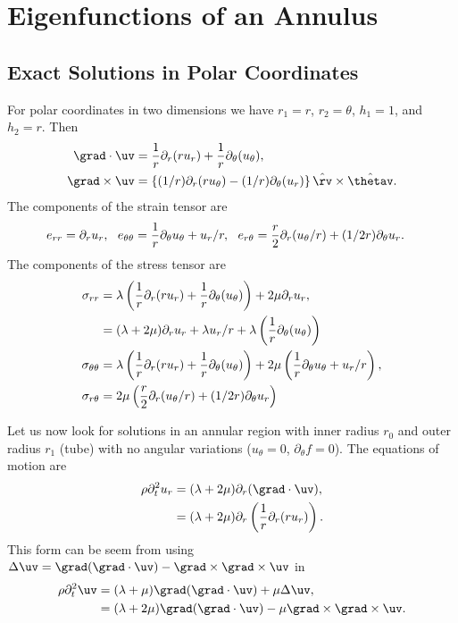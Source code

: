 \newcommand{\annulusEigenDir}{\homeHenshaw/cgDoc/sm}
\section{Eigenfunctions of an Annulus}

\subsection{Exact Solutions in Polar Coordinates}

For polar coordinates in two dimensions we have $r_1=r$, $r_2=\theta$, $h_1=1$, and $h_2=r$. 
Then
\begin{align*}
   \grad\cdot\uv &= {1\over r} \partial_r( r u_r) + {1\over r}\partial_\theta( u_\theta), \\
   \grad\times\uv &= 
             \left\{ (1/r)\partial_r(r u_\theta)-(1/r)\partial_\theta(u_r) \right\} \hat{\rv}\times\hat{\thetav}.
\end{align*}
The components of the strain tensor are
\begin{align*}
    e_{rr} &= \partial_r u_r,~~ e_{\theta\theta}={1\over r}\partial_\theta u_\theta + u_r/r, ~~
    e_{r\theta} = {r\over 2}\partial_r(u_\theta/r) + (1/2r)\partial_\theta u_r . 
\end{align*}
The components of the stress tensor are 
\begin{align}
  \sigma_{rr} & = \lambda \left( {1\over r} \partial_r( r u_r) + {1\over r}\partial_\theta( u_\theta)\right)
              + 2\mu \partial_r u_r, \\
              &= (\lambda+2\mu)\partial_r u_r + \lambda u_r/r + 
                       \lambda \left({1\over r}\partial_\theta( u_\theta)\right) \label{eq:polarSigmarr} \\
  \sigma_{\theta\theta} &= \lambda \left( {1\over r} \partial_r( r u_r) + {1\over r}\partial_\theta( u_\theta)\right)
              + 2\mu \left({1\over r}\partial_\theta u_\theta + u_r/r\right),  \\
  \sigma_{r\theta} &= 2\mu\left( {r\over 2}\partial_r(u_\theta/r) + (1/2r)\partial_\theta u_r \right)
\end{align}

Let us now look for solutions in an annular region with inner radius $r_0$ and 
outer radius $r_1$ (tube) with no angular variations ($u_\theta=0$, $\partial_\theta f=0$).
The equations of motion are
\begin{align}
  \rho \partial_t^2 u_r &= (\lambda+2\mu)\partial_r(\grad\cdot\uv), \label{eq:polarua}  \\
            &= (\lambda+2\mu)\partial_r\left( {1\over r} \partial_r( r u_r) \right) \label{eq:polarub}. 
\end{align}
This form can be seem from using $\Delta \uv = \grad(\grad\cdot\uv)-\grad\times\grad\times\uv$ in 
\begin{align*}
  \rho \partial_t^2 \uv &= (\lambda+\mu)\grad(\grad\cdot\uv) + \mu \Delta \uv, \\
                        &= (\lambda+2\mu)\grad(\grad\cdot\uv) -\mu \grad\times\grad\times\uv  . 
\end{align*}


